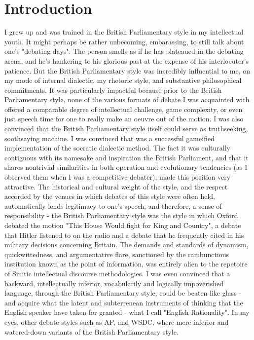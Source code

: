 \section{Introduction}

I grew up and was trained in the British Parliamentary style in my intellectual youth. It might perhaps be rather unbecoming, embarassing, to still talk about one's "debating days". The person smells as if he has plateaued in the debating arena, and he's hankering to his glorious past at the expense of his interlocuter's patience. But the British Parliamentary style was incredibly influential to me, on my mode of internal dialectic, my rhetoric style, and substantive philosophical commitments. It was particularly impactful because prior to the British Parliamentary style, none of the various formats of debate I was acquainted with offered a comparable degree of intellectual challenge, game complexity, or even just speech time for one to really make an oeuvre out of the motion. I was also convinced that the British Parliamentary style itself could serve as truthseeking, soothsaying machine. I was convinced that was a successful gameified implementation of the socratic dialectic method. The fact it was culturally contiguous with its namesake and inspiration the British Parliament, and that it shares nontrivial similarities in both operation and evolutionary tendencies (as I observed them when I was a competitive debater), made this position very attractive. The historical and cultural weight of the style, and the respect accorded by the venues in which debates of this style were often held, automatically lends legitimacy to one's speech, and therefore, a sense of responsibility - the British Parliamentary style was the style in which Oxford debated the motion "This House Would fight for King and Country", a debate that Hitler listened to on the radio and a debate that he frequently cited in his military decisions concerning Britain. The demands and standards of dynamism, quickwittedness, and argumentative flare, sanctioned by the rambunctious institution known as the point of information, was entirely alien to the repetoire of Sinitic intellectual discourse methodologies. I was even convinced that a backward, intellectually inferior, vocabularily and logically impoverished language, through the British Parliamentary style, could be beaten like glass - and acquire what the latent and subterrenean instruments of thinking that the English speaker have taken for granted - what I call "English Rationality". In my eyes, other debate styles such as AP, and WSDC, where mere inferior and watered-down variants of the British Parliamentary style.

